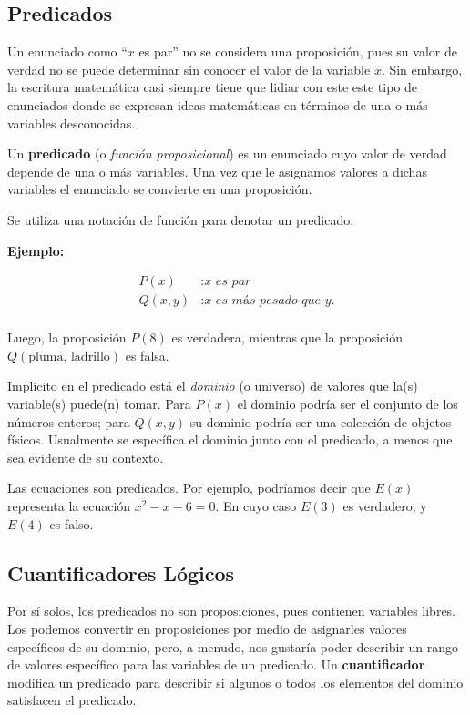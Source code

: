 \subsection{Predicados}

Un enunciado como ``$x$ es par'' no se considera una proposición, pues su valor de verdad no se puede determinar sin conocer el valor de la variable $x$. Sin embargo, la escritura matemática casi siempre tiene que lidiar con este este tipo de enunciados donde se expresan ideas matemáticas en términos de una o más variables desconocidas.

Un \textbf{predicado} (o \textit{función proposicional}) es un enunciado cuyo valor de verdad depende de una o más variables. Una vez que le asignamos valores a dichas variables el enunciado se convierte en una proposición.

Se utiliza una notación de función para denotar un predicado. 

\textbf{Ejemplo:}

\begin{equation*}
    \begin{split}
        P(x) &: \textit{x es par} \\
        Q(x,y) &: \textit{x es más pesado que y.} \\
    \end{split}
\end{equation*}

Luego, la proposición $P(8)$ es verdadera, mientras que la proposición $Q(\text{pluma, ladrillo})$ es falsa.

Implícito en el predicado está el \textit{dominio} (o universo) de valores que la(s) variable(s) puede(n) tomar. Para $P(x)$ el dominio podría ser el conjunto de los números enteros; para $Q(x,y)$ su dominio podría ser una colección de objetos físicos. Usualmente se específica el dominio junto con el predicado, a menos que sea evidente de su contexto.

Las ecuaciones son predicados. Por ejemplo, podríamos decir que $E(x)$ representa la ecuación $x^2-x-6=0$. En cuyo caso $E(3)$ es verdadero, y $E(4)$ es falso.

\subsection{Cuantificadores Lógicos}

Por sí solos, los predicados no son proposiciones, pues contienen variables libres. Los podemos convertir en proposiciones por medio de asignarles valores específicos de su dominio, pero, a menudo, nos gustaría poder describir un rango de valores específico para las variables de un predicado. Un \textbf{cuantificador} modifica un predicado para describir si algunos o todos los elementos del dominio satisfacen el predicado.

